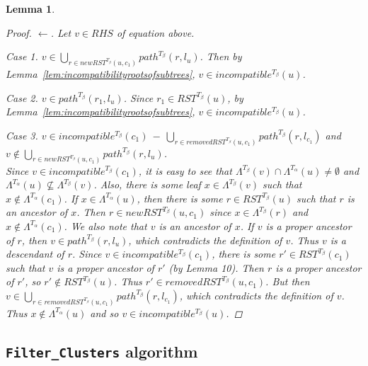 \documentclass{article}
\newcommand{\leafset}{\Lambda}
\newcommand{\TA}{T_\alpha}
\newcommand{\TB}{T_\beta}
\newtheorem{incompatibilityrecursive}[incompatibility]{Lemma}
\begin{document}
\begin{incompatibilityrecursive}
\begin{proof}
            $\longleftarrow$. Let $v \in RHS$ of equation above.

            \textit{Case 1.} $v \in \bigcup_{r \in newRST^{\TB}(u, c_1)} path^{\TB}(r, l_u)$. Then by Lemma~\ref{lem:incompatibilityrootsofsubtrees}, $v \in incompatible^{\TB}(u)$.

            \textit{Case 2.} $v \in path^{\TB}(r_1, l_u)$. Since $r_1 \in RST^{\TB}(u)$, by Lemma~\ref{lem:incompatibilityrootsofsubtrees}, $v \in incompatible^{\TB}(u)$.

            \textit{Case 3.} $v \in incompatible^{\TB}(c_1)\ -\ \bigcup_{r \in removedRST^{\TB}(u, c_1)} path^{\TB}(r, l_{c_1})$ and\\[0.25em] %
            $v \not\in \bigcup_{r \in newRST^{\TB}(u, c_1)} path^{\TB}(r, l_u)$.\\[0.25em]
            Since $v \in incompatible^{\TB}(c_1)$, it is easy to see that $\leafset^{\TB}(v) \cap \leafset^{\TA}(u) \neq \emptyset$ and $\leafset^{\TA}(u) \not\subseteq \leafset^{\TB}(v)$. Also, there is some leaf $x \in \leafset^{\TB}(v)$ such that $x \not\in \leafset^{\TA}(c_1)$. If $x \in \leafset^{\TA}(u)$, then there is some $r \in RST^{\TB}(u)$ such that $r$ is an ancestor of $x$. Then $r \in newRST^{\TB}(u, c_1)$ since $x \in \leafset^{\TB}(r)$ and $x \not\in \leafset^{\TA}(c_1)$. We also note that $v$ is an ancestor of $x$. If $v$ is a proper ancestor of $r$, then $v \in path^{\TB}(r, l_u)$, which contradicts the definition of $v$. Thus $v$ is a descendant of $r$. Since $v \in incompatible^{\TB}(c_1)$, there is some $r' \in RST^{\TB}(c_1)$ such that $v$ is a proper ancestor of $r'$ (by Lemma 10). Then $r$ is a proper ancestor of $r'$, so $r' \not\in RST^{\TB}(u)$. Thus $r' \in removedRST^{\TB}(u, c_1)$. But then $v \in \bigcup_{r \in removedRST^{\TB}(u, c_1)} path^{\TB}(r, l_{c_1})$, which contradicts the definition of $v$. Thus $x \not\in \leafset^{\TA}(u)$ and so $v \in incompatible^{\TB}(u)$.
        \end{proof}
    \end{incompatibilityrecursive}


    \subsection{\texttt{Filter\_Clusters} algorithm}
    \label{subsec:filterclustersalgorithm}
\end{document}
